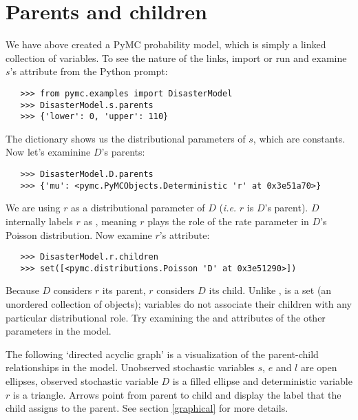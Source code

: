 \section{Parents and children}

We have above created a PyMC probability model, which is simply a linked collection of variables. To see the nature of the links, import or run  and examine $s$'s  attribute from the Python prompt:
\begin{verbatim}
   >>> from pymc.examples import DisasterModel
   >>> DisasterModel.s.parents
   >>> {'lower': 0, 'upper': 110}
\end{verbatim}
The  dictionary shows us the distributional parameters of $s$, which are constants. Now let's examinine $D$'s parents:
\begin{verbatim}
   >>> DisasterModel.D.parents
   >>> {'mu': <pymc.PyMCObjects.Deterministic 'r' at 0x3e51a70>}
\end{verbatim}
We are using $r$ as a distributional parameter of $D$ (\emph{i.e.} $r$ is $D$'s parent). $D$ internally labels $r$ as , meaning $r$ plays the role of the rate parameter in $D$'s Poisson distribution. Now examine $r$'s  attribute:
\begin{verbatim}
   >>> DisasterModel.r.children
   >>> set([<pymc.distributions.Poisson 'D' at 0x3e51290>])
\end{verbatim}
Because $D$ considers $r$ its parent, $r$ considers $D$ its child. Unlike ,  is a set (an unordered collection of objects); variables do not associate their children with any particular distributional role. Try examining the  and  attributes of the other parameters in the model.

The following `directed acyclic graph' is a visualization of the parent-child relationships in the model. Unobserved stochastic variables $s$, $e$ and $l$ are open ellipses, observed stochastic variable $D$ is a filled ellipse and deterministic variable $r$ is a triangle. Arrows point from parent to child and display the label that the child assigns to the parent. See section \ref{graphical} for more details.
\begin{center}
\end{center}

